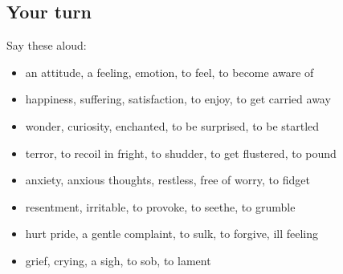 \subsection*{Your turn}
Say these aloud:

\begin{itemize}
\raggedright
  \item an attitude, a feeling, emotion, to feel, to become aware of
  \item happiness, suffering, satisfaction, to enjoy, to get carried away
  \item wonder, curiosity, enchanted, to be surprised, to be startled
  \item terror, to recoil in fright, to shudder, to get flustered, to pound
  \item anxiety, anxious thoughts, restless, free of worry, to fidget
  \item resentment, irritable, to provoke, to seethe, to grumble
  \item hurt pride, a gentle complaint, to sulk, to forgive, ill feeling
  \item grief, crying, a sigh, to sob, to lament
\end{itemize}

